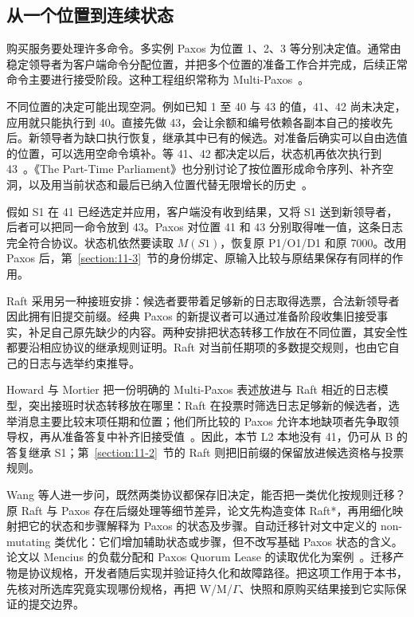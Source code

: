 \subsection*{从一个位置到连续状态}

购买服务要处理许多命令。多实例 Paxos 为位置 1、2、3 等分别决定值。通常由稳定领导者为客户端命令分配位置，并把多个位置的准备工作合并完成，后续正常命令主要进行接受阶段。这种工程组织常称为 Multi-Paxos~\cite{paxos-made-simple}。

不同位置的决定可能出现空洞。例如已知 1 至 40 与 43 的值，41、42 尚未决定，应用就只能执行到 40。直接先做 43，会让余额和编号依赖各副本自己的接收先后。新领导者为缺口执行恢复，继承其中已有的候选。对准备后确实可以自由选值的位置，可以选用空命令填补。等 41、42 都决定以后，状态机再依次执行到 43~\cite{paxos-made-simple}。《The Part-Time Parliament》也分别讨论了按位置形成命令序列、补齐空洞，以及用当前状态和最后已纳入位置代替无限增长的历史~\cite{part-time-parliament}。


假如 S1 在 41 已经选定并应用，客户端没有收到结果，又将 S1 送到新领导者，后者可以把同一命令放到 43。Paxos 对位置 41 和 43 分别取得唯一值，这条日志完全符合协议。状态机依然要读取 $M(S1)$，恢复原 P1/O1/D1 和原 7000。改用 Paxos 后，第~\ref{section:11-3}~节的身份绑定、原输入比较与原结果保存有同样的作用。

Raft 采用另一种接班安排：候选者要带着足够新的日志取得选票，合法新领导者因此拥有旧提交前缀。经典 Paxos 的新提议者可以通过准备阶段收集旧接受事实，补足自己原先缺少的内容。两种安排把状态转移工作放在不同位置，其安全性都要沿相应协议的继承规则证明。Raft 对当前任期项的多数提交规则，也由它自己的日志与选举约束推导。


Howard 与 Mortier 把一份明确的 Multi-Paxos 表述放进与 Raft 相近的日志模型，突出接班时状态转移放在哪里：Raft 在投票时筛选日志足够新的候选者，选举消息主要比较末项任期和位置；他们所比较的 Paxos 允许本地缺项者先争取领导权，再从准备答复中补齐旧接受值~\cite{paxos-vs-raft}。因此，本节 L2 本地没有 41，仍可从 B 的答复继承 S1；第~\ref{section:11-2}~节的 Raft 则把旧前缀的保留放进候选资格与投票规则。

Wang 等人进一步问，既然两类协议都保存旧决定，能否把一类优化按规则迁移？原 Raft 与 Paxos 存在后缀处理等细节差异，论文先构造变体 Raft*，再用细化映射把它的状态和步骤解释为 Paxos 的状态及步骤。自动迁移针对文中定义的 non-mutating 类优化：它们增加辅助状态或步骤，但不改写基础 Paxos 状态的含义。论文以 Mencius 的负载分配和 Paxos Quorum Lease 的读取优化为案例~\cite{paxos-raft-parallels}。迁移产物是协议规格，开发者随后实现并验证持久化和故障路径。把这项工作用于本书，先核对所选库究竟实现哪份规格，再把 W/M/$\Gamma$、快照和原购买结果接到它实际保证的提交边界。

